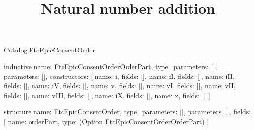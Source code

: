 \begin{lexlean}{Catalog.FtcEpicConsentOrder}
\title{Natural number addition}
\begin{semanticmodule}
inductive{
  name: FtcEpicConsentOrderOrderPart,
  type_parameters: [],
  parameters: [],
  constructors: [
    {name: i, fields: []},
    {name: iI, fields: []},
    {name: iII, fields: []},
    {name: iV, fields: []},
    {name: v, fields: []},
    {name: vI, fields: []},
    {name: vII, fields: []},
    {name: vIII, fields: []},
    {name: iX, fields: []},
    {name: x, fields: []}
  ]
}

structure{
  name: FtcEpicConsentOrder,
  type_parameters: [],
  parameters: [],
  fields: [
    {name: orderPart, type: (Option FtcEpicConsentOrderOrderPart)}
  ]
}
\end{semanticmodule}
\end{lexlean}
